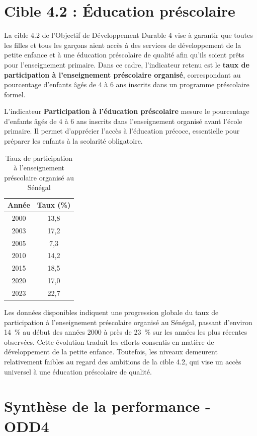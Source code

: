 \section*{Cible 4.2 : Éducation préscolaire}

La cible 4.2 de l’Objectif de Développement Durable 4 vise à garantir que toutes les filles et tous les garçons aient accès à des services de développement de la petite enfance et à une éducation préscolaire de qualité afin qu’ils soient prêts pour l’enseignement primaire. Dans ce cadre, l’indicateur retenu est le \textbf{taux de participation à l’enseignement préscolaire organisé}, correspondant au pourcentage d’enfants âgés de 4 à 6 ans inscrits dans un programme préscolaire formel.

L'indicateur \textbf{Participation à l'éducation préscolaire} mesure le pourcentage d'enfants âgés de 4 à 6 ans inscrits dans l'enseignement organisé avant l'école primaire. Il permet d'apprécier l'accès à l'éducation précoce, essentielle pour préparer les enfants à la scolarité obligatoire.

\begin{table}[H]
	\centering
	\caption{Taux de participation à l’enseignement préscolaire organisé au Sénégal}
	\begin{tabular}{cc}
		\hline
		\textbf{Année} & \textbf{Taux (\%)} \\
		\hline
		2000 & 13,8 \\
		2003 & 17,2 \\
		2005 & 7,3 \\
		2010 & 14,2 \\
		2015 & 18,5 \\
		2020 & 17,0 \\
		2023 & 22,7 \\
		\hline
	\end{tabular}
	\label{tab:preprimary}
\end{table}

\noindent
Les données disponibles indiquent une progression globale du taux de participation à l’enseignement préscolaire organisé au Sénégal, passant d’environ 14~\% au début des années 2000 à près de 23~\% sur les années les plus récentes observées. Cette évolution traduit les efforts consentis en matière de développement de la petite enfance. Toutefois, les niveaux demeurent relativement faibles au regard des ambitions de la cible 4.2, qui vise un accès universel à une éducation préscolaire de qualité.


\section*{Synthèse de la performance - ODD4}

